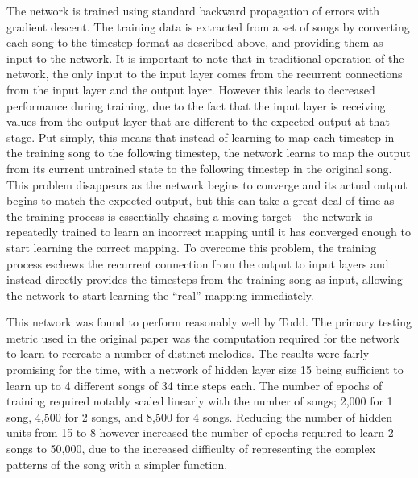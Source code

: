 \documentclass[ author={Stephen Livermore-Tozer},
				supervisor={Dr. Peter Flach},
				degree={MEng},
				title={Algorithmic Co-composition Using Machine Learning},
				subtitle={},
				type={research},
				year={2016} ]{dissertation}
\begin{document}
	The network is trained using standard backward propagation of errors with gradient descent. The training data is extracted from a set of songs by converting each song to the timestep format as described above, and providing them as input to the network. It is important to note that in traditional operation of the network, the only input to the input layer comes from the recurrent connections from the input layer and the output layer. However this leads to decreased performance during training, due to the fact that the input layer is receiving values from the output layer that are different to the expected output at that stage. Put simply, this means that instead of learning to map each timestep in the training song to the following timestep, the network learns to map the output from its current untrained state to the following timestep in the original song. This problem disappears as the network begins to converge and its actual output begins to match the expected output, but this can take a great deal of time as the training process is essentially chasing a moving target - the network is repeatedly trained to learn an incorrect mapping until it has converged enough to start learning the correct mapping. To overcome this problem, the training process eschews the recurrent connection from the output to input layers and instead directly provides the timesteps from the training song as input, allowing the network to start learning the ``real'' mapping immediately.
	
	This network was found to perform reasonably well by Todd. The primary testing metric used in the original paper was the computation required for the network to learn to recreate a number of distinct melodies. The results were fairly promising for the time, with a network of hidden layer size 15 being sufficient to learn up to 4 different songs of 34 time steps each. The number of epochs of training required notably scaled linearly with the number of songs; 2,000 for 1 song, 4,500 for 2 songs, and 8,500 for 4 songs. Reducing the number of hidden units from 15 to 8 however increased the number of epochs required to learn 2 songs to 50,000, due to the increased difficulty of representing the complex patterns of the song with a simpler function.
	
\end{document}
